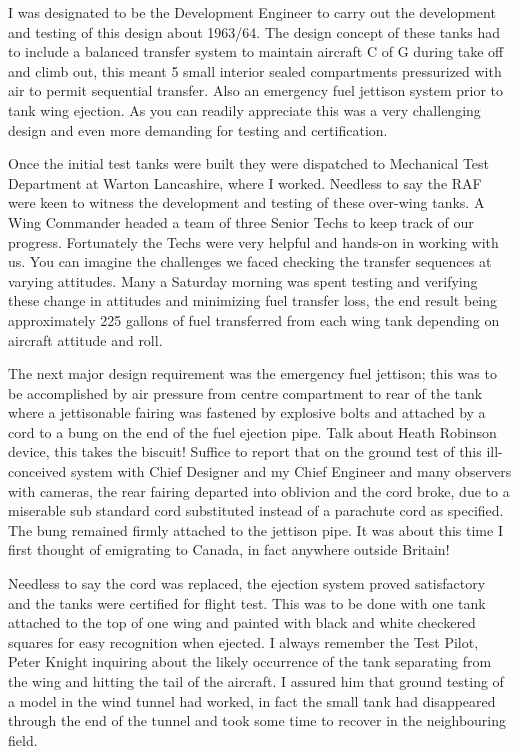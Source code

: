 I was designated to be the Development Engineer to carry out the
development and testing of this design about 1963/64. The design
concept of these tanks had to include a balanced transfer system to
maintain aircraft C of G during take off and climb out, this meant 5
small interior sealed compartments pressurized with air to permit
sequential transfer. Also an emergency fuel jettison system prior to
tank wing ejection. As you can readily appreciate this was a very
challenging design and even more demanding for testing and
certification.

Once the initial test tanks were built they were dispatched to
Mechanical Test Department at Warton Lancashire, where I worked.
Needless to say the RAF were keen to witness the development and
testing of these over-wing tanks. A Wing Commander headed a team of
three Senior Techs to keep track of our progress. Fortunately the
Techs were very helpful and hands-on in working with us.  You can
imagine the challenges we faced checking the transfer sequences at
varying attitudes. Many a Saturday morning was spent testing and
verifying these change in attitudes and minimizing fuel transfer loss,
the end result being approximately 225 gallons of fuel transferred
from each wing tank depending on aircraft attitude and roll.

The next major design requirement was the emergency fuel jettison;
this was to be accomplished by air pressure from centre compartment to
rear of the tank where a jettisonable fairing was fastened by
explosive bolts and attached by a cord to a bung on the end of the
fuel ejection pipe. Talk about Heath Robinson device, this takes the
biscuit! Suffice to report that on the ground test of this
ill-conceived system with Chief Designer and my Chief Engineer and
many observers with cameras, the rear fairing departed into oblivion
and the cord broke, due to a miserable sub standard cord substituted
instead of a parachute cord as specified. The bung remained firmly
attached to the jettison pipe. It was about this time I first thought
of emigrating to Canada, in fact anywhere outside Britain!

Needless to say the cord was replaced, the ejection system proved
satisfactory and the tanks were certified for flight test. This was to
be done with one tank attached to the top of one wing and painted with
black and white checkered squares for easy recognition when ejected. I
always remember the Test Pilot, Peter Knight inquiring about the
likely occurrence of the tank separating from the wing and hitting the
tail of the aircraft. I assured him that ground testing of a model in
the wind tunnel had worked, in fact the small tank had disappeared
through the end of the tunnel and took some time to recover in the
neighbouring field.

